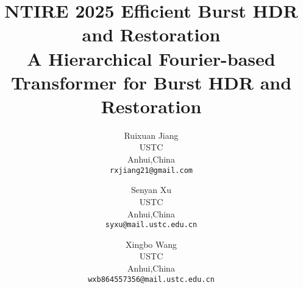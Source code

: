\documentclass[10pt,twocolumn,letterpaper]{article}
\begin{document}
	
	\title{NTIRE 2025 Efficient Burst HDR and Restoration\\A Hierarchical Fourier-based Transformer for Burst HDR and Restoration}
	





\author{Ruixuan Jiang\\
	USTC\\
	Anhui,China\\
	{\tt\small rxjiang21@gmail.com}
	\and
	Senyan Xu\\
	USTC\\
	Anhui,China\\
	{\tt\small syxu@mail.ustc.edu.cn}
\and
Xingbo Wang\\
USTC\\
Anhui,China\\
{\tt\small wxb864557356@mail.ustc.edu.cn}
}
\maketitle
\end{document}
